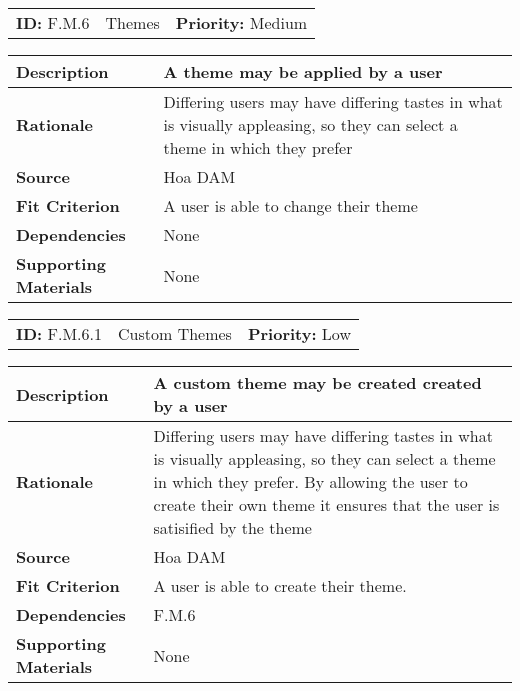 \begin{table}[H]
    \begin{tabularx}{\textwidth}{| l | X | l |}
        \hline
        \textbf{ID:} F.M.6 & Themes & \textbf{Priority:} Medium \\
    \end{tabularx}
    \begin{tabularx}{\textwidth}{| l | X |}
        \hline
        \textbf{Description} & A theme may be applied by a user\\ \hline
        \textbf{Rationale} & Differing users may have differing tastes in what is visually appleasing, so they can select a theme in which they prefer\\ \hline
        \textbf{Source} & Hoa DAM\\ \hline
        \textbf{Fit Criterion} & A user is able to change their theme \\ \hline
        \textbf{Dependencies} & None \\ \hline
        \textbf{Supporting Materials} & None \\ \hline
    \end{tabularx}
\end{table}

\begin{table}[H]
    \begin{tabularx}{\textwidth}{| l | X | l |}
        \hline
        \textbf{ID:} F.M.6.1 & Custom Themes & \textbf{Priority:} Low \\
    \end{tabularx}
    \begin{tabularx}{\textwidth}{| l | X |}
        \hline
        \textbf{Description} & A custom theme may be created created by a user\\ \hline
        \textbf{Rationale} & Differing users may have differing tastes in what is visually appleasing, so they can select a theme in which they prefer. By allowing the user to create their own theme it ensures that the user is satisified by the theme\\ \hline
        \textbf{Source} & Hoa DAM\\ \hline
        \textbf{Fit Criterion} & A user is able to create their theme.\\ \hline
        \textbf{Dependencies} & F.M.6 \\ \hline
        \textbf{Supporting Materials} & None \\ \hline
    \end{tabularx}
\end{table}

